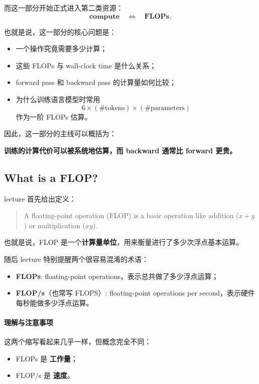 \documentclass[a4paper,UTF8]{article}
\numberwithin{equation}{section}
\begin{document}
而这一部分开始正式进入第二类资源：
\[
\textbf{compute} \quad \Longleftrightarrow \quad \textbf{FLOPs}.
\]

也就是说，这一部分的核心问题是：
\begin{itemize}
    \item 一个操作究竟需要多少计算；
    \item 这些 FLOPs 与 wall-clock time 是什么关系；
    \item forward pass 和 backward pass 的计算量如何比较；
    \item 为什么训练语言模型时常用
    \[
    6 \times (\#\text{tokens}) \times (\#\text{parameters})
    \]
    作为一阶 FLOPs 估算。
\end{itemize}

因此，这一部分的主线可以概括为：
\begin{center}
\textbf{训练的计算代价可以被系统地估算，而 backward 通常比 forward 更贵。}
\end{center}

\subsection{What is a FLOP?}

lecture 首先给出定义：
\begin{quote}
A floating-point operation (FLOP) is a basic operation like addition (\(x+y\)) or multiplication (\(xy\)).
\end{quote}

也就是说，FLOP 是一个\textbf{计算量单位}，用来衡量进行了多少次浮点基本运算。

随后 lecture 特别提醒两个很容易混淆的术语：
\begin{itemize}
    \item \textbf{FLOPs}: floating-point operations，表示总共做了多少浮点运算；
    \item \textbf{FLOP/s}（也常写 FLOPS）: floating-point operations per second，表示硬件每秒能做多少浮点运算。
\end{itemize}

\paragraph{理解与注意事项}
这两个缩写看起来几乎一样，但概念完全不同：
\begin{itemize}
    \item FLOPs 是 \textbf{工作量}；
    \item FLOP/s 是 \textbf{速度}。
\end{itemize}
\end{document}
